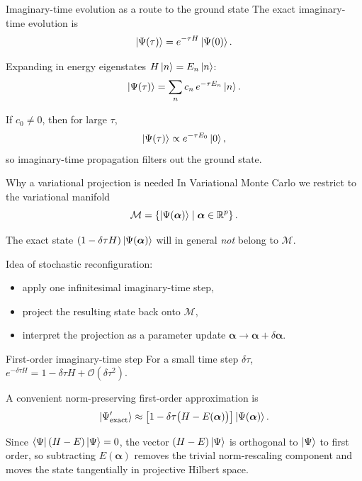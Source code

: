 \documentclass[aspectratio=169]{beamer}
\begin{document}
\begin{frame}{Imaginary-time evolution as a route to the ground state}
The exact imaginary-time evolution is
\[
\ket{\Psi(\tau)}=e^{-\tau H}\ket{\Psi(0)}.
\]

Expanding in energy eigenstates \(H\ket{n}=E_n\ket{n}\):
\[
\ket{\Psi(\tau)}=\sum_n c_n\,e^{-\tau E_n}\ket{n}.
\]

If \(c_0\neq 0\), then for large \(\tau\),
\[
\ket{\Psi(\tau)} \propto e^{-\tau E_0}\ket{0},
\]
so imaginary-time propagation filters out the ground state.
\end{frame}

\begin{frame}{Why a variational projection is needed}
In Variational Monte Carlo we restrict to the variational manifold
\[
\mathcal{M}
=\left\{\ket{\Psi(\bm{\alpha})}\;\middle|\;\bm{\alpha}\in\mathbb{R}^p\right\}.
\]

The exact state
\(
(1-\delta\tau H)\ket{\Psi(\bm{\alpha})}
\)
will in general \emph{not} belong to \(\mathcal{M}\).

\medskip

Idea of stochastic reconfiguration:
\begin{itemize}
  \item apply one infinitesimal imaginary-time step,
  \item project the resulting state back onto \(\mathcal{M}\),
  \item interpret the projection as a parameter update
        \(\bm{\alpha}\to\bm{\alpha}+\delta\bm{\alpha}\).
\end{itemize}
\end{frame}

\begin{frame}{First-order imaginary-time step}
For a small time step \(\delta\tau\),
\(
e^{-\delta\tau H}=1-\delta\tau H+\mathcal{O}(\delta\tau^2).
\)

A convenient norm-preserving first-order approximation is
\[
\ket{\Psi_{\mathrm{exact}}'}
\approx
\left[1-\delta\tau\bigl(H-E(\bm{\alpha})\bigr)\right]\ket{\Psi(\bm{\alpha})}.
\]

Since \(\bra{\Psi}(H-E)\ket{\Psi}=0\), the vector \((H-E)\ket{\Psi}\)
is orthogonal to \(\ket{\Psi}\) to first order, so subtracting
\(E(\bm{\alpha})\) removes the trivial norm-rescaling component and
moves the state tangentially in projective Hilbert space.
\end{frame}
\end{document}
